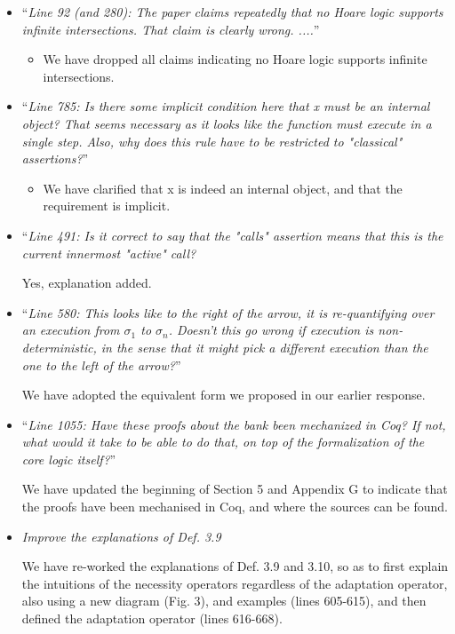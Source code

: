 \documentclass[11pt]{amsart}
\begin{document}
\begin{itemize}
\begin{itemize}
\item
``\emph{Line 92 (and 280): The paper claims repeatedly that no Hoare logic supports infinite intersections. That claim is clearly wrong. ....}''
\begin{itemize}
\item
We have dropped all claims indicating no Hoare logic supports infinite intersections.
\end{itemize}

\item
``\emph{Line 785: Is there some implicit condition here that x must be an internal object? That seems necessary as it looks like the function must execute in a single step. Also, why does this rule have to be restricted to "classical" assertions?}''
\begin{itemize}
\item
We have clarified that x is indeed an internal object, and that the requirement is implicit.
\end{itemize}

\item
``\emph{Line 491: Is it correct to say that the "calls" assertion means that this is the current innermost "active" call?}

Yes, explanation added.

\item
``\emph{Line 580: This looks like to the right of the arrow, it is re-quantifying over an execution from $\sigma_1$ to $\sigma_n$. Doesn't this go wrong if execution is non-deterministic, in the sense that it might pick a different execution than the one to the left of the arrow?}''
 
We have adopted the equivalent form we proposed in our earlier response. 
 
\item
``\emph{Line 1055: Have these proofs about the bank been mechanized in Coq? If not, what would it take to be able to do that, on top of the formalization of the core logic itself?}''
 
We have updated the beginning of Section 5 and Appendix G to indicate that the proofs have been mechanised in Coq, and where the sources can be found.
 
 

\item
\emph{Improve the explanations of Def. 3.9}

We have re-worked the explanations of Def. 3.9  and 3.10, so as to first explain the intuitions of the necessity operators regardless of the adaptation operator, also using a new  diagram (Fig. 3), and examples (lines  605-615), and then defined the adaptation operator (lines 616-668).


\end{itemize}
\end{itemize}
\end{document}

